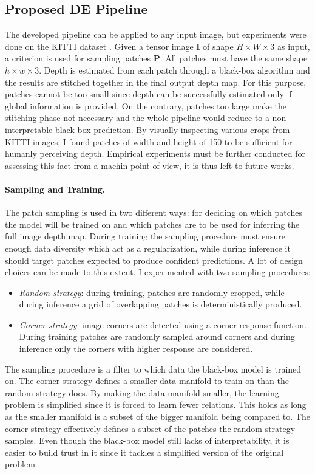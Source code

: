 \subsection{Proposed DE Pipeline}
The developed pipeline can be applied to any input image, but experiments were done on the KITTI dataset \cite{KITTI}.
Given a tensor image $\mathbf{I}$ of shape $H \times W \times 3$ as input, a criterion is used for sampling patches $\mathbf{P}$.
All patches must have the same shape $h \times w \times 3$.
Depth is estimated from each patch through a black-box algorithm and the results are stitched together in the final output depth map.
For this purpose, patches cannot be too small since depth can be successfully estimated only if global information is provided.
On the contrary, patches too large make the stitching phase not necessary and the whole pipeline would reduce to a non-interpretable black-box prediction.
By visually inspecting various crops from KITTI images, I found patches of width and height of 150 to be sufficient for humanly perceiving depth.
Empirical experiments must be further conducted for assessing this fact from a machin point of view, it is thus left to future works.

\vfill

\paragraph{Sampling and Training.}
The patch sampling is used in two different ways: for deciding on which patches the model will be trained on and which patches are to be used for inferring the full image depth map. 
During training the sampling procedure must ensure enough data diversity which act as a regularization, while during inference it should target patches expected to produce confident predictions.
A lot of design choices can be made to this extent.
I experimented with two sampling procedures:
\begin{itemize}
    \item{
        \textit{Random strategy}: during training, patches are randomly cropped, while during inference a grid of overlapping patches is deterministically produced.}
    \item{
        \textit{Corner strategy}: image corners are detected using a corner response function.
        During training patches are randomly sampled around corners and during inference only the corners with higher response are considered.
    }
\end{itemize}
The sampling procedure is a filter to which data the black-box model is trained on.
The corner strategy defines a smaller data manifold to train on than the random strategy does.
By making the data manifold smaller, the learning problem is simplified since it is forced to learn fewer relations.
This holds as long as the smaller manifold is a subset of the bigger manifold being compared to.
The corner strategy effectively defines a subset of the patches the random strategy samples.
Even though the black-box model still lacks of interpretability, it is easier to build trust in it since it tackles a simplified version of the original problem.


